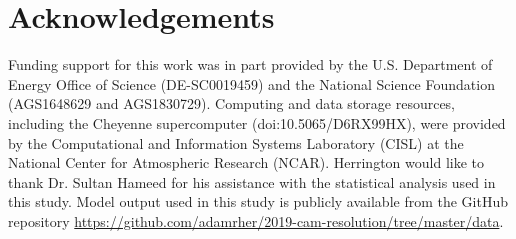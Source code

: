 \documentclass[alpha-refs]{wiley-article}
\begin{document}
\section{Acknowledgements}\label{acknowledgements}

Funding support for this work was in part provided by the U.S. Department of Energy Office of Science (DE-SC0019459) and the National Science Foundation (AGS1648629 and AGS1830729). Computing and data storage resources, including the Cheyenne supercomputer (doi:10.5065/D6RX99HX), were provided by the Computational and Information Systems Laboratory (CISL) at the National Center for Atmospheric Research (NCAR). Herrington would like to thank Dr. Sultan Hameed for his assistance with the statistical analysis used in this study. Model output used in this study is publicly available from the GitHub repository \url{https://github.com/adamrher/2019-cam-resolution/tree/master/data}.


\end{document}
